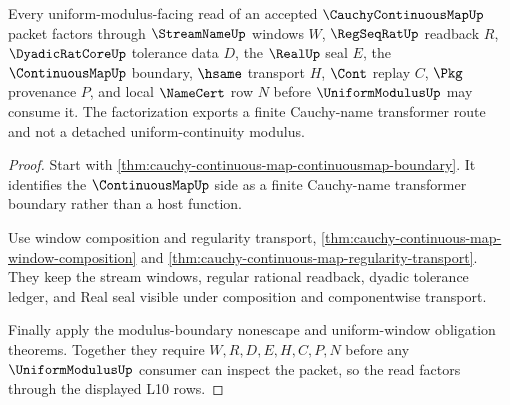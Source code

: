 \begin{theorem}
\label{thm:cauchy-continuous-map-uniform-modulus-factorization}
Every uniform-modulus-facing read of an accepted $\CauchyContinuousMapUp$ packet factors through $\StreamNameUp$ windows $W$, $\RegSeqRatUp$ readback $R$, $\DyadicRatCoreUp$ tolerance data $D$, the $\RealUp$ seal $E$, the $\ContinuousMapUp$ boundary, $\hsame$ transport $H$, $\Cont$ replay $C$, $\Pkg$ provenance $P$, and local $\NameCert$ row $N$ before $\UniformModulusUp$ may consume it. The factorization exports a finite Cauchy-name transformer route and not a detached uniform-continuity modulus.
\end{theorem}
\begin{proof}
Start with \autoref{thm:cauchy-continuous-map-continuousmap-boundary}. It identifies the $\ContinuousMapUp$ side as a finite Cauchy-name transformer boundary rather than a host function.

Use window composition and regularity transport, \autoref{thm:cauchy-continuous-map-window-composition} and \autoref{thm:cauchy-continuous-map-regularity-transport}. They keep the stream windows, regular rational readback, dyadic tolerance ledger, and Real seal visible under composition and componentwise transport.

Finally apply the modulus-boundary nonescape and uniform-window obligation theorems. Together they require $W,R,D,E,H,C,P,N$ before any $\UniformModulusUp$ consumer can inspect the packet, so the read factors through the displayed L10 rows.
\end{proof}

